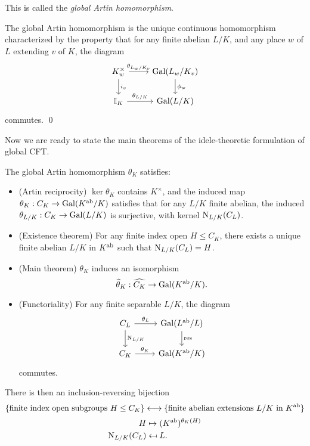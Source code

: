 \documentclass[11pt]{amsart}
\begin{document}
\begin{defn}
    This is called the \emph{global Artin homomorphism}.
\end{defn}

\begin{prop}
    The global Artin homomorphism is the unique continuous homomorphism characterized by the property that for any finite abelian $L/K$, and any place $w$ of $L$ extending $v$ of $K$, the diagram
    \[
    \begin{tikzcd}
        K_w^\times \arrow[r, "\theta_{L_w/K_v}"] \arrow[d, "i_v"] & \Gal(L_w/K_v) \arrow[d, "\phi_w"] \\
        \II_K \arrow[r, "\theta_{L/K}"] & \Gal(L/K)
    \end{tikzcd}
    \]
    commutes. \qed
\end{prop}


Now we are ready to state the main theorems of the idele-theoretic formulation of global CFT.

\begin{thm}
\label{ideleCFT}
    The global Artin homomorphism $\theta_K$ satisfies:
    \begin{itemize}
    \item (Artin reciprocity) $\ker \theta_K$ contains $K^\times$, and the induced map $\theta_K: C_K\to \operatorname{Gal}(K^{\operatorname{ab}}/K)$ satisfies that for any $L/K$ finite abelian, the induced $\theta_{L/K}: C_K\to\operatorname{Gal}(L/K)$ is surjective, with kernel $\operatorname{N}_{L/K}(C_L)$.
    \item (Existence theorem) For any finite index open $H\le C_K$, there exists a unique finite abelian $L/K$ in $K^{\operatorname{ab}}$ such that $\operatorname{N}_{L/K}(C_L) = H$.
    \item (Main theorem) $\theta_K$ induces an isomorphism
    \[\widehat{\theta}_K: \widehat{C_K} \to \operatorname{Gal}(K^{\operatorname{ab}}/K).\]
    \item (Functoriality) For any finite separable $L/K$, the diagram
    \[
    \begin{tikzcd}
        C_L \arrow[r, "\theta_L"] \arrow[d, "\N_{L/K}"] & \Gal(L^{\ab}/L) \arrow[d, "\res"] \\
        C_K \arrow[r, "\theta_K"] & \Gal(K^{\ab}/K)
    \end{tikzcd}
    \]
    commutes.
    \end{itemize}
\end{thm}

\begin{Rem}
    There is then an inclusion-reversing bijection
    \[\{\text{finite index open subgroups } H\le C_K\} \longleftrightarrow \{\text{finite abelian extensions } L/K \text{ in } K^{\operatorname{ab}}\}\]
    \begin{align*}
        H &\mapsto (K^{\operatorname{ab}})^{\theta_K(H)} \\
        \operatorname{N}_{L/K}(C_L) &\mapsfrom L.
    \end{align*}
\end{Rem}
\end{document}
